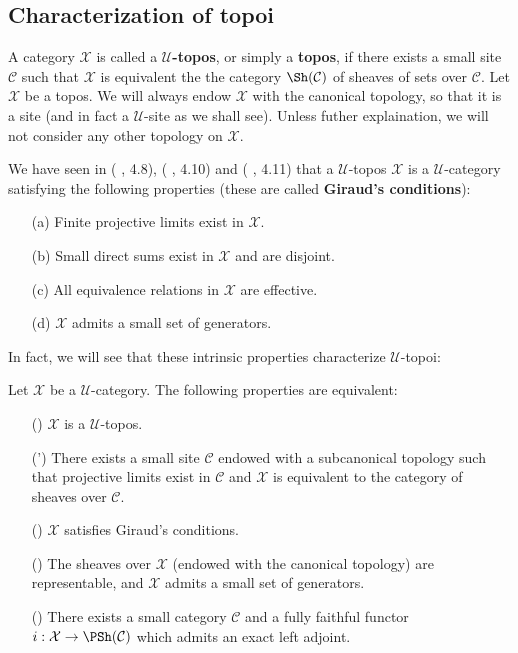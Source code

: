 \subsection{Characterization of topoi}
A category $\mathcal{X}$ is called a \textbf{$\mathscr{U}$-topos}, or simply a \textbf{topos}, if there exists a small site $\mathcal{C}$ such that $\mathcal{X}$ is equivalent the the category $\Sh(\mathcal{C})$ of sheaves of sets over $\mathcal{C}$. Let $\mathcal{X}$ be a topos. We will always endow $\mathcal{X}$ with the canonical topology, so that it is a site (and in fact a $\mathscr{U}$-site as we shall see). Unless futher explaination, we will not consider any other topology on $\mathcal{X}$.\par
We have seen in (\cite{SGA4-1} , 4.8), (\cite{SGA4-1} , 4.10) and (\cite{SGA4-1} , 4.11) that a $\mathscr{U}$-topos $\mathcal{X}$ is a $\mathscr{U}$-category satisfying the following properties (these are called \textbf{Giraud's conditions}):
\begin{enumerate}
\item[(a)] Finite projective limits exist in $\mathcal{X}$.
\item[(b)] Small direct sums exist in $\mathcal{X}$ and are disjoint.
\item[(c)] All equivalence relations in $\mathcal{X}$ are effective.
\item[(d)] $\mathcal{X}$ admits a small set of generators.
\end{enumerate}
In fact, we will see that these intrinsic properties characterize $\mathscr{U}$-topoi:
\begin{theorem}\label{topos Giraud characterization}
Let $\mathcal{X}$ be a $\mathscr{U}$-category. The following properties are equivalent:
\begin{enumerate}
\item[(\rmnum{1})] $\mathcal{X}$ is a $\mathscr{U}$-topos.
\item[(\rmnum{1}')] There exists a small site $\mathcal{C}$ endowed with a subcanonical topology such that projective limits exist in $\mathcal{C}$ and $\mathcal{X}$ is equivalent to the category of sheaves over $\mathcal{C}$.
\item[(\rmnum{2})] $\mathcal{X}$ satisfies Giraud's conditions.
\item[(\rmnum{3})] The sheaves over $\mathcal{X}$ (endowed with the canonical topology) are representable, and $\mathcal{X}$ admits a small set of generators.
\item[(\rmnum{4})] There exists a small category $\mathcal{C}$ and a fully faithful functor $i:\mathcal{X}\to \PSh(\mathcal{C})$ which admits an exact left adjoint.
\end{enumerate}
\end{theorem}
